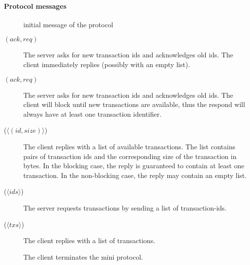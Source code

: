 \paragraph{Protocol messages}
\begin{description}
\item [\MsgInit] initial message of the protocol
\item [\MsgRequestTxIdsNB{} {\boldmath $(ack,req)$}]
      The server asks for new transaction ids and acknowledges old ids.
      The client immediately replies (possibly with an empty list).
\item [\MsgRequestTxIdsB{} {\boldmath $(ack,req)$}]
      The server asks for new transaction ids and acknowledges old ids.
      The client will block until new transactions are available, thus the
      respond will always have at least one transaction identifier. 
\item [\MsgReplyTxIds{} {\boldmath ($\langle (id, size) \rangle$) }]
      The client replies with a list of available transactions.
      The list contains pairs of transaction ids and the corresponding size of the transaction in bytes.
      In the blocking case, the reply is guaranteed to contain at least one transaction.
      In the non-blocking case, the reply may contain an empty list.
\item [\MsgRequestTxs{} {\boldmath ($\langle ids \rangle$)}]
      The server requests transactions by sending a list of transaction-ids.
\item [\MsgReplyTxs{} {\boldmath ($\langle txs \rangle$})]
      The client replies with a list of transactions.
\item [\MsgDone]
      The client terminates the mini protocol.
\end{description}

